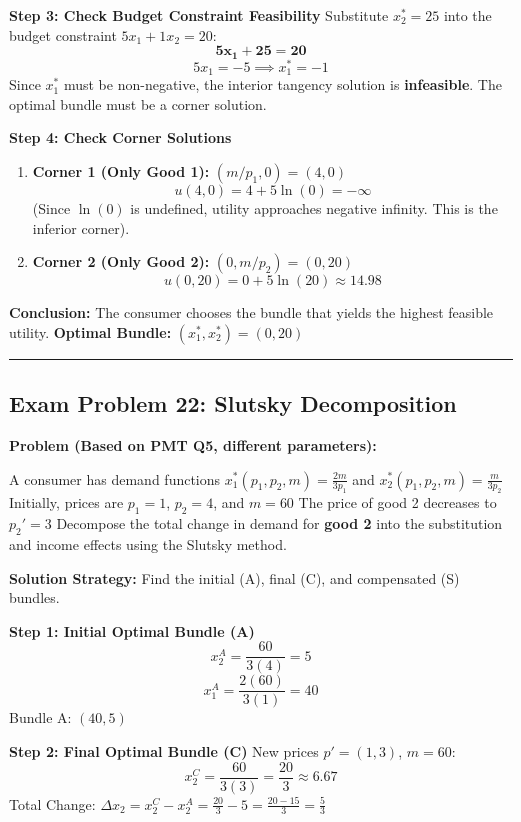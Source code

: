 \documentclass{article}
\begin{document}
\textbf{Step 3: Check Budget Constraint Feasibility}
Substitute $x_2^*=25$ into the budget constraint $5x_1 + 1x_2 = 20$:
\[ \boldsymbol{5x_1 + 25 = 20} \]
\[ 5x_1 = -5 \implies x_1^* = -1 \]
Since $x_1^*$ must be non-negative, the interior tangency solution is \textbf{infeasible}. The optimal bundle must be a corner solution.

\textbf{Step 4: Check Corner Solutions}
\begin{enumerate}
    \item \textbf{Corner 1 (Only Good 1):} $(m/p_1, 0) = (4, 0)$
    \[ u(4, 0) = 4 + 5 \ln(0) = -\infty \]
    (Since $\ln(0)$ is undefined, utility approaches negative infinity. This is the inferior corner).

    \item \textbf{Corner 2 (Only Good 2):} $(0, m/p_2) = (0, 20)$
    \[ u(0, 20) = 0 + 5 \ln(20) \approx 14.98 \]
\end{enumerate}

\textbf{Conclusion:} The consumer chooses the bundle that yields the highest feasible utility. \textbf{Optimal Bundle:} $(x_1^*, x_2^*) = (0, 20)$

\bigskip\noindent\rule{\linewidth}{0.4pt}\bigskip

\subsection*{\textbf{Exam Problem 22: Slutsky Decomposition}}

\textbf{Problem (Based on PMT Q5, different parameters):}

A consumer has demand functions $x_1^*(p_1, p_2, m) = \frac{2m}{3p_1}$ and $x_2^*(p_1, p_2, m) = \frac{m}{3p_2}$ Initially, prices are $p_1=1$, $p_2=4$, and $m=60$ The price of good 2 decreases to $p_2'=3$ Decompose the total change in demand for \textbf{good 2} into the substitution and income effects using the Slutsky method.

\textbf{Solution Strategy:} Find the initial (A), final (C), and compensated (S) bundles.

\textbf{Step 1: Initial Optimal Bundle (A)}
\[ x_2^A = \frac{60}{3(4)} = 5 \]
\[ x_1^A = \frac{2(60)}{3(1)} = 40 \]
Bundle A: $(40, 5)$

\textbf{Step 2: Final Optimal Bundle (C)}
New prices $p'=(1, 3)$, $m=60$:
\[ x_2^C = \frac{60}{3(3)} = \frac{20}{3} \approx 6.67 \]
Total Change: $\Delta x_2 = x_2^C - x_2^A = \frac{20}{3} - 5 = \frac{20 - 15}{3} = \frac{5}{3}$
\end{document}

